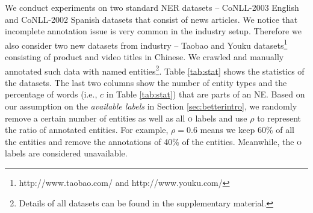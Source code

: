 We conduct experiments on two standard NER datasets -- CoNLL-2003 English and CoNLL-2002 Spanish datasets that consist of news articles. 
We notice that incomplete annotation issue is very common in the industry setup. Therefore we also consider two new datasets from industry  -- Taobao and Youku datasets\footnote{http://www.taobao.com/ and http://www.youku.com/} consisting of product and video titles in Chinese.	
We crawled and manually annotated such data with named entities\footnote{Details of all datasets can be found in the supplementary material.}.
Table \ref{tab:stat} shows the statistics of the datasets. 
The last two columns show the number of entity types and the percentage of words (i.e., $c$ in Table \ref{tab:stat}) that are parts of an NE. 
Based on our assumption on the {\em available labels} in Section \ref{sec:betterintro}, we randomly remove a certain number of entities as well as all \textsc{o} labels and use $\rho$ to represent the ratio of annotated entities.  
For example, $\rho=0.6$ means we keep 60\% of all the entities and remove the annotations of 40\% of the entities. 
Meanwhile, the \textsc{o} labels are considered unavailable. 

